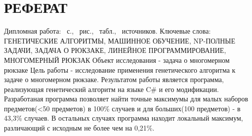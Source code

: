 \chapter*{РЕФЕРАТ}
\thispagestyle{empty}   %
Дипломная работа: \pageref*{LastPage}~с., \totfig~рис., \tottab~табл., \totref~источников.
Ключевые слова: ГЕНЕТИЧЕСКИЕ АЛГОРИТМЫ, МАШИННОЕ ОБУЧЕНИЕ, NP-ПОЛНЫЕ ЗАДАЧИ, ЗАДАЧА О РЮКЗАКЕ, ЛИНЕЙНОЕ ПРОГРАММИРОВАНИЕ, МНОГОМЕРНЫЙ РЮКЗАК
Объект исследования - задача о многомерном рюкзаке
Цель работы - исследование применения генетического алгоритма к задаче о многомерном рюкзаке.
Результатом работы является программа, реализующая генетический алгоритм на языке C\# и его модификации.
Разработаная программа позволяет найти точные максимумы для малых наборов предметов(<50 предметов) в 100\% случаев и для больших(100 предметов) - в 43,3\% случаев. В остальных случаях программа находит локальный максимум, различающий с исходным не более чем на 0,21\%.

\cleardoublepage               %
